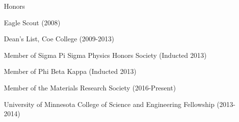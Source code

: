 \documentclass{resume} %
\begin{document}
\begin{rSection}{Honors}

\item Eagle Scout (2008)
\item Dean's List, Coe College (2009-2013)
\item Member of Sigma Pi Sigma Physics Honors Society (Inducted 2013)
\item Member of Phi Beta Kappa (Inducted 2013)
\item Member of the Materials Research Society (2016-Present)
\item University of Minnesota College of Science and Engineering Fellowship (2013-2014)

\end{rSection}



\end{document}
